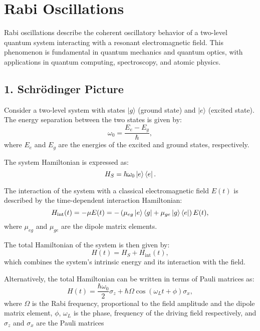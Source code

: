 
\section{Rabi Oscillations}

Rabi oscillations describe the coherent oscillatory behavior of a two-level quantum system interacting with a resonant electromagnetic field.
This phenomenon is fundamental in quantum mechanics and quantum optics, with applications in quantum computing, spectroscopy, and atomic physics.

\subsection{1. Schrödinger Picture}
Consider a two-level system with states \(|g\rangle\) (ground state) and \(|e\rangle\) (excited state).
The energy separation between the two states is given by:
\begin{equation}
	\omega_0 = \frac{E_e - E_g}{\hbar},
	\label{eq:EnergySeparation}
\end{equation}
where \(E_e\) and \(E_g\) are the energies of the excited and ground states, respectively.

The system Hamiltonian is expressed as:
\begin{equation}
	H_S = \hbar \omega_0 \ket{e}\bra{e}.
	\label{eq:SystemHamiltonian}
\end{equation}


The interaction of the system with a classical electromagnetic field \(E(t)\) is described by the time-dependent interaction Hamiltonian:
\begin{equation}
	H_{\text{int}}(t) = - \mu E(t) = -\left( \mu_{eg} \ket{e}\bra{g} + \mu_{ge} \ket{g}\bra{e} \right) E(t),
	\label{eq:InteractionHamiltonian}
\end{equation}
where \(\mu_{eg}\) and \(\mu_{ge}\) are the dipole matrix elements.

The total Hamiltonian of the system is then given by:
\begin{equation}
	H(t) = H_S + H_{\text{int}}(t),
	\label{eq:TotalHamiltonian}
\end{equation}
which combines the system's intrinsic energy and its interaction with the field.

Alternatively, the total Hamiltonian can be written in terms of Pauli matrices as:
\begin{equation}
	H(t) = \frac{\hbar \omega_0}{2} \sigma_z + \hbar \Omega \cos(\omega_L t + \phi) \sigma_x,
	\label{eq:RabiHamiltonian}
\end{equation}
where \(\Omega\) is the Rabi frequency, proportional to the field amplitude and the dipole matrix element, \(\phi\), \(\omega_L\) is the phase, frequency of the driving field respectively, and \(\sigma_z\) and \(\sigma_x\) are the Pauli matrices

